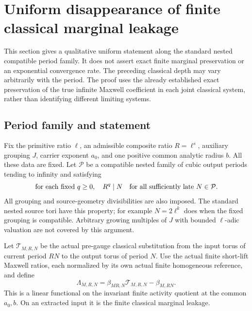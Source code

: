 \section{Uniform disappearance of finite classical marginal leakage}
\label{fml-section}

This section gives a qualitative uniform statement along the
standard nested compatible period family. It does not assert
exact finite marginal preservation or an exponential convergence
rate. The preceding classical depth may vary arbitrarily with
the period. The proof uses the already established exact
preservation of the true infinite Maxwell coefficient in each
joint classical system, rather than identifying different
limiting systems.

\subsection{Period family and statement}
\label{fml-setup-section}

Fix the primitive ratio \(\ell\), an admissible composite ratio
\(R=\ell^s\), auxiliary grouping \(J\), carrier exponent \(a_0\),
and one positive common analytic radius \(b\). All these data
are fixed. Let \(\mathcal P\) be a compatible nested family of
cubic output periods tending to infinity and satisfying
\begin{equation}
 \text{for each fixed }q\ge0,\quad
 R^q\mid N\quad\hbox{for all sufficiently late }N\in\mathcal P.
 \label{fml-divisibility}
\end{equation}
All grouping and source-geometry divisibilities are also
imposed. The standard nested source tori have this property;
for example \(N=2\ell^k\) does when the fixed grouping is
compatible. Arbitrary growing multiples of \(J\) with bounded
\(\ell\)-adic valuation are not covered by this argument.

Let \(\mathcal T_{M,R,N}\) be the actual pre-gauge classical
substitution from the input torus of current period \(RN\)
to the output torus of period \(N\). Use the actual finite
short-lift Maxwell ratios, each normalized by its own actual
finite homogeneous reference, and define
\begin{equation}
 \Lambda_{M,R,N}
   =\beta_{MR,N}\mathcal T_{M,R,N}-\beta_{M,RN}.
 \label{fml-leakage}
\end{equation}
This is a linear functional on the invariant finite activity
quotient at the common \(a_0,b\). On an extracted input it
is the finite classical marginal leakage.

